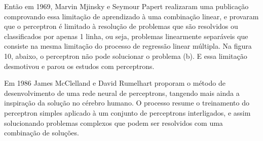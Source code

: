 \documentclass[	12pt, Times, openright, twoside, a4paper, english, brazil]{abntex2}
\begin{document}
          Então em 1969, Marvin Mjinsky e Seymour Papert realizaram uma publicação comprovando essa limitação de aprendizado à uma combinação linear, e provaram que o perceptron é limitado à resolução de problemas que são resolvidos ou classificados por apenas 1 linha, ou seja, problemas linearmente separáveis que consiste na mesma limitação do processo de regressão linear múltipla.
          Na figura 10, abaixo, o perceptron não pode solucionar o problema (b). E essa limitação desmotivou e parou os estudos com perceptrons.
    		  \begin{figure}[H]
    		  	
    		  \end{figure}
	  	
	  	 Em 1986 James McClelland e David Rumelhart proporam o método de desenvolvimento de uma rede neural de perceptrons, tangendo mais ainda a inspiração da solução no cérebro humano. O processo resume o treinamento do perceptron simples aplicado à um conjunto de perceptrons interligados, e assim solucionando problemas complexos que podem ser resolvidos com uma combinação de soluções.
	  	  
  	  	  \begin{figure}[H]
  	  	   \end{figure}
\end{document}
